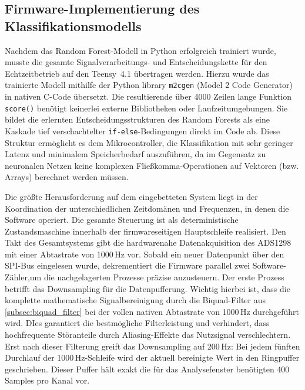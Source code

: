     \subsection{Firmware-Implementierung des Klassifikationsmodells}
    Nachdem das Random Forest-Modell in Python erfolgreich trainiert wurde, musste die gesamte Signalverarbeitungs- und Entscheidungskette für den Echtzeitbetrieb auf den \textsf{Teensy~4.1} übertragen werden. Hierzu wurde das trainierte Modell mithilfe der Python library \texttt{m2cgen} (Model 2 Code Generator) in nativen C-Code übersetzt. Die resultierende über 4000 Zeilen lange Funktion \texttt{score()} benötigt keinerlei externe Bibliotheken oder Laufzeitumgebungen. Sie bildet die erlernten Entscheidungsstrukturen des Random Forests als eine Kaskade tief verschachtelter \texttt{if-else}-Bedingungen direkt im Code ab. Diese Struktur ermöglicht es dem Mikrocontroller, die Klassifikation mit sehr geringer Latenz und minimalem Speicherbedarf auszuführen, da im Gegensatz zu neuronalen Netzen keine komplexen Fließkomma-Operationen auf Vektoren (bzw. Arrays) berechnet werden müssen.

    Die größte Herausforderung auf dem eingebetteten System liegt in der Koordination der unterschiedlichen Zeitdomänen und Frequenzen, in denen die Software operiert. Die gesamte Steuerung ist als deterministische Zustandsmaschine innerhalb der firmwareseitigen Hauptschleife realisiert. Den Takt des Gesamtsystems gibt die hardwarenahe Datenakquisition des \textsf{ADS1298} mit einer Abtastrate von 1000\,Hz vor. Sobald ein neuer Datenpunkt über den \ac{SPI}-Bus eingelesen wurde, dekrementiert die Firmware parallel zwei Software-Zähler,um die nachgelagerten Prozesse präzise anzusteuern.
    Der erste Prozess betrifft das Downsampling für die Datenpufferung. Wichtig hierbei ist, dass die komplette mathematische Signalbereinigung durch die Biquad-Filter aus \autoref{subsec:biquad_filter} bei der vollen nativen Abtastrate von 1000\,Hz durchgeführt wird. DIes garantiert die bestmögliche Filterleistung und verhindert, dass hochfrequente Störanteile durch Aliasing-Effekte das Nutzsignal verschlechtern. Erst nach dieser Filterung greift das Downsampling auf 200\,Hz: Bei jedem fünften Durchlauf der 1000\,Hz-Schleife wird der aktuell bereinigte Wert in den Ringpuffer geschrieben. Dieser Puffer hält exakt die für das Analysefenster benötigten 400 Samples pro Kanal vor.

